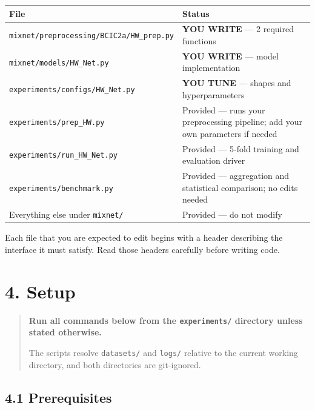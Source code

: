 \documentclass[
  10pt,
]{article}
\newcounter{none} %
\begin{document}
{\def\LTcaptype{none} %
\begin{longtable}[]{@{}
  >{\raggedright\arraybackslash}p{}
  >{\raggedright\arraybackslash}p{}@{}}
\toprule\noalign{}
\begin{minipage}[b]{\linewidth}\raggedright
File
\end{minipage} & \begin{minipage}[b]{\linewidth}\raggedright
Status
\end{minipage} \\
\midrule\noalign{}
\endhead
\bottomrule\noalign{}
\endlastfoot
\texttt{mixnet/preprocessing/BCIC2a/HW\_prep.py} & \textbf{YOU WRITE}
--- 2 required functions \\
\texttt{mixnet/models/HW\_Net.py} & \textbf{YOU WRITE} --- model
implementation \\
\texttt{experiments/configs/HW\_Net.py} & \textbf{YOU TUNE} --- shapes
and hyperparameters \\
\texttt{experiments/prep\_HW.py} & Provided --- runs your
preprocessing pipeline; add your own parameters if needed \\
\texttt{experiments/run\_HW\_Net.py} & Provided --- 5-fold training
and evaluation driver \\
\texttt{experiments/benchmark.py} & Provided --- aggregation and
statistical comparison; no edits needed \\
Everything else under \texttt{mixnet/} & Provided --- do not modify \\
\end{longtable}
}

Each file that you are expected to edit begins with a header
describing the interface it must satisfy. Read those headers carefully
before writing code.

\section{4. Setup}\label{setup}

\begin{quote}
\textbf{Run all commands below from the \texttt{experiments/}
directory unless stated otherwise.}

The scripts resolve \texttt{datasets/} and \texttt{logs/} relative to
the current working directory, and both directories are git-ignored.
\end{quote}

\subsection{4.1 Prerequisites}\label{prerequisites}
\end{document}
